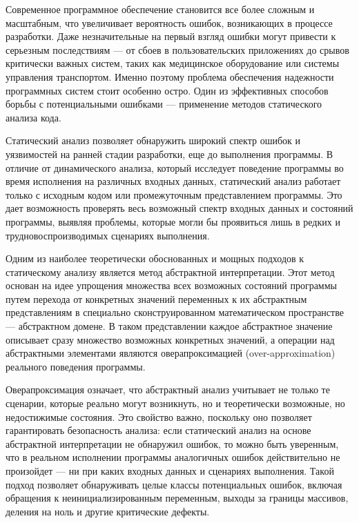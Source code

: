 Современное программное обеспечение становится все более сложным и масштабным, что увеличивает вероятность ошибок, возникающих в процессе разработки. Даже незначительные на первый взгляд ошибки могут привести к серьезным последствиям — от сбоев в пользовательских приложениях до срывов критически важных систем, таких как медицинское оборудование или системы управления транспортом. Именно поэтому проблема обеспечения надежности программных систем стоит особенно остро. Один из эффективных способов борьбы с потенциальными ошибками — применение методов статического анализа кода.

Статический анализ позволяет обнаружить широкий спектр ошибок и уязвимостей на ранней стадии разработки, еще до выполнения программы. В отличие от динамического анализа, который исследует поведение программы во время исполнения на различных входных данных, статический анализ работает только с исходным кодом или промежуточным представлением программы. Это дает возможность проверять весь возможный спектр входных данных и состояний программы, выявляя проблемы, которые могли бы проявиться лишь в редких и трудновоспроизводимых сценариях выполнения.

Одним из наиболее теоретически обоснованных и мощных подходов к статическому анализу является метод абстрактной интерпретации. Этот метод основан на идее упрощения множества всех возможных состояний программы путем перехода от конкретных значений переменных к их абстрактным представлениям в специально сконструированном математическом пространстве — абстрактном домене. В таком представлении каждое абстрактное значение описывает сразу множество возможных конкретных значений, а операции над абстрактными элементами являются оверапроксимацией (over-approximation) реального поведения программы.

Оверапроксимация означает, что абстрактный анализ учитывает не только те сценарии, которые реально могут возникнуть, но и теоретически возможные, но недостижимые состояния. Это свойство важно, поскольку оно позволяет гарантировать безопасность анализа: если статический анализ на основе абстрактной интерпретации не обнаружил ошибок, то можно быть уверенным, что в реальном исполнении программы аналогичных ошибок действительно не произойдет — ни при каких входных данных и сценариях выполнения. Такой подход позволяет обнаруживать целые классы потенциальных ошибок, включая обращения к неинициализированным переменным, выходы за границы массивов, деления на ноль и другие критические дефекты.

